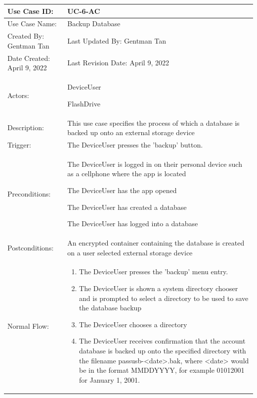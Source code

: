 \documentclass[stu]{apa7}
\newcommand{\nextitem}{\par\hspace*{\labelsep}\textbullet\hspace*{\labelsep}}
\begin{document}
\scriptsize{\begin{xltabular}{\textwidth}{|l|X|}
  \hline Use Case ID: & UC-6-AC \\ \hline

  Use Case Name: & Backup Database \\ \hline

  Created By: Gentman Tan & Last Updated By: Gentman Tan\\ \hline

  Date Created: April 9, 2022 & Last Revision Date: April 9, 2022 \\ \hline

  Actors: & \nextitem DeviceUser \nextitem FlashDrive  \\ \hline

  Description: & This use case specifies the process of which a database is backed up onto an external storage device \\ \hline

  Trigger: & The DeviceUser presses the 'backup' button. \\ \hline

  Preconditions: & \nextitem The DeviceUser is logged in on their personal device such as a cellphone where the app is located \nextitem The DeviceUser has the app opened \nextitem The DeviceUser has created a database \nextitem The DeviceUser has logged into a database \\ \hline

  Postconditions: & \nextitem An encrypted container containing the database is created on a user selected external storage device  \\ \hline

  Normal Flow: &
    \begin{enumerate}
      \item The DeviceUser presses the 'backup' menu entry.
      \item The DeviceUser is shown a system directory chooser and is prompted to select a directory to be used to save the database backup
      \item The DeviceUser chooses a directory
      \item The DeviceUser receives confirmation that the account database is backed up onto the specified directory with the filename passusb-<date>.bak, where <date> would be in the format MMDDYYYY, for example 01012001 for January 1, 2001.
    \end{enumerate} \\ \hline


\end{xltabular}}
\end{document}
